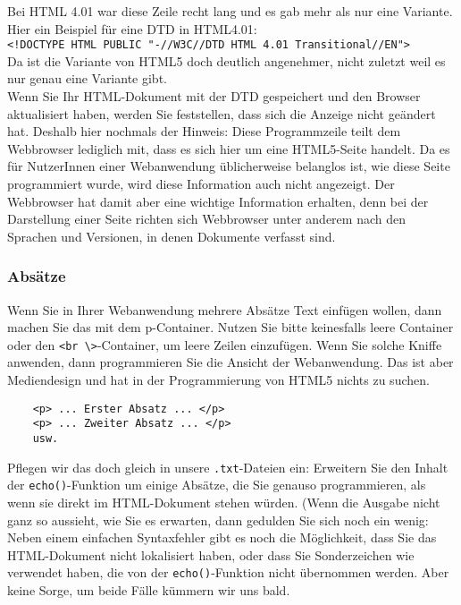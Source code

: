 Bei HTML 4.01 war diese Zeile recht lang und es gab mehr als nur eine Variante. Hier ein Beispiel für eine DTD in HTML4.01:\\

\verb|<!DOCTYPE HTML PUBLIC "-//W3C//DTD HTML 4.01 Transitional//EN">|\\

Da ist die Variante von HTML5 doch deutlich angenehmer, nicht zuletzt weil es nur genau eine Variante gibt.\\

Wenn Sie Ihr HTML-Dokument mit der DTD gespeichert und den Browser aktualisiert haben, werden Sie feststellen, dass sich die Anzeige nicht geändert hat. Deshalb hier nochmals der Hinweis: Diese Programmzeile teilt dem Webbrowser lediglich mit, dass es sich hier um eine HTML5-Seite handelt. Da es für NutzerInnen einer Webanwendung üblicherweise belanglos ist, wie diese Seite programmiert wurde, wird diese Information auch nicht angezeigt. Der Webbrowser hat damit aber eine wichtige Information erhalten, denn bei der Darstellung einer Seite richten sich Webbrowser unter anderem nach den Sprachen und Versionen, in denen Dokumente verfasst sind.

\subsubsection{Absätze}

Wenn Sie in Ihrer Webanwendung mehrere Absätze Text einfügen wollen, dann machen Sie das mit dem p-Container. Nutzen Sie bitte keinesfalls leere Container oder den \verb|<br \>|-Container, um leere Zeilen einzufügen. Wenn Sie solche Kniffe anwenden, dann programmieren Sie die Ansicht der Webanwendung. Das ist aber Mediendesign und hat in der Programmierung von HTML5 nichts zu suchen.

\begin{verbatim}
	<p> ... Erster Absatz ... </p>
	<p> ... Zweiter Absatz ... </p>
	usw.
\end{verbatim}

Pflegen wir das doch gleich in unsere \verb|.txt|-Dateien ein: Erweitern Sie den Inhalt der \verb|echo()|-Funktion um einige Absätze, die Sie genauso programmieren, als wenn sie direkt im HTML-Dokument stehen würden. (Wenn die Ausgabe nicht ganz so aussieht, wie Sie es erwarten, dann gedulden Sie sich noch ein wenig: Neben einem einfachen Syntaxfehler gibt es noch die Möglichkeit, dass Sie das HTML-Dokument nicht lokalisiert haben, oder dass Sie Sonderzeichen wie \grqq{} verwendet haben, die von der \verb|echo()|-Funktion nicht übernommen werden. Aber keine Sorge, um beide Fälle kümmern wir uns bald.

